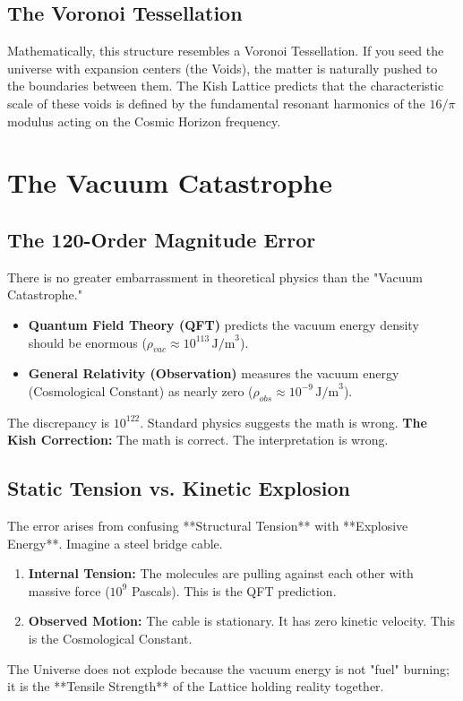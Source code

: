 \documentclass[11pt, letterpaper, openany]{book}
\begin{document}
\section{The Voronoi Tessellation}
Mathematically, this structure resembles a Voronoi Tessellation. If you seed the universe with expansion centers (the Voids), the matter is naturally pushed to the boundaries between them.
The Kish Lattice predicts that the characteristic scale of these voids is defined by the fundamental resonant harmonics of the $16/\pi$ modulus acting on the Cosmic Horizon frequency.


\chapter{The Vacuum Catastrophe}
\label{chap:vacuum_catastrophe}

\section{The 120-Order Magnitude Error}
There is no greater embarrassment in theoretical physics than the "Vacuum Catastrophe."
\begin{itemize}
    \item \textbf{Quantum Field Theory (QFT)} predicts the vacuum energy density should be enormous ($\rho_{vac} \approx 10^{113} \, \text{J/m}^3$).
    \item \textbf{General Relativity (Observation)} measures the vacuum energy (Cosmological Constant) as nearly zero ($\rho_{obs} \approx 10^{-9} \, \text{J/m}^3$).
\end{itemize}
The discrepancy is $10^{122}$. Standard physics suggests the math is wrong.
\textbf{The Kish Correction:} The math is correct. The interpretation is wrong.

\section{Static Tension vs. Kinetic Explosion}
The error arises from confusing **Structural Tension** with **Explosive Energy**.
Imagine a steel bridge cable.
\begin{enumerate}
    \item \textbf{Internal Tension:} The molecules are pulling against each other with massive force ($10^9$ Pascals). This is the QFT prediction.
    \item \textbf{Observed Motion:} The cable is stationary. It has zero kinetic velocity. This is the Cosmological Constant.
\end{enumerate}
The Universe does not explode because the vacuum energy is not "fuel" burning; it is the **Tensile Strength** of the Lattice holding reality together.
\end{document}

